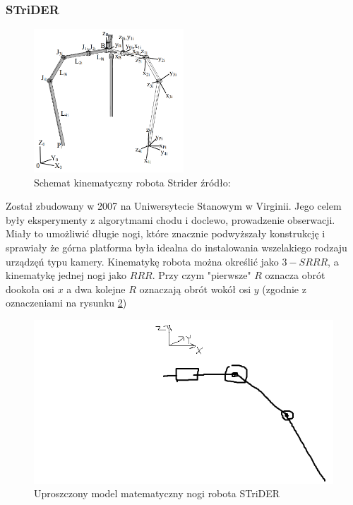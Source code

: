\documentclass[a4paper,13pt]{article}
\begin{document}
\subsubsection{STriDER}
\begin{figure}[H]
\centering
\includegraphics[width=0.5\textwidth]{img/strider_photo.png}
\caption{Schemat kinematyczny robota Strider źródło: \cite{strider}}
\label{martian_photo}
\end{figure}
Został zbudowany w 2007 na Uniwersytecie Stanowym w Virginii. Jego celem były eksperymenty z algorytmami chodu i doclewo, prowadzenie obserwacji. Miały to umożliwić długie nogi, które znacznie podwyższały konstrukcję i sprawiały że górna platforma była idealna do instalowania wszelakiego rodzaju urządzęń typu kamery. Kinematykę robota można określić jako $3-SRRR$, a kinematykę jednej nogi jako $RRR$. Przy czym "pierwsze" $R$ oznacza obrót dookoła osi $x$ a dwa kolejne $R$ oznaczają obrót wokół osi $y$ (zgodnie z oznaczeniami na rysunku \ref{strider_math})  \cite{strider}\\

\begin{figure}[H]
\centering
\includegraphics[width=\textwidth]{img/strider_math.png}
\caption{Uproszczony model matematyczny nogi robota STriDER}
\label{strider_math}
\end{figure}
\end{document}
